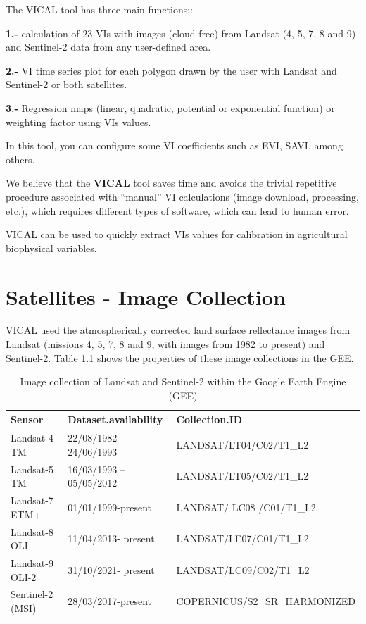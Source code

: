 \documentclass[
]{book}
\begin{document}
The VICAL tool has three main functions::

\textbf{1.-} calculation of 23 VIs with images (cloud-free) from Landsat (4, 5, 7, 8 and 9) and Sentinel-2 data from any user-defined area.

\textbf{2.-} VI time series plot for each polygon drawn by the user with Landsat and Sentinel-2 or both satellites.

\textbf{3.-} Regression maps (linear, quadratic, potential or exponential function) or weighting factor using VIs values.

In this tool, you can configure some VI coefficients such as EVI, SAVI, among others.

We believe that the \textbf{VICAL} tool saves time and avoids the trivial repetitive procedure associated with ``manual'' VI calculations (image download, processing, etc.), which requires different types of software, which can lead to human error.

VICAL can be used to quickly extract VIs values for calibration in agricultural biophysical variables.

\hypertarget{Sat}{%
\chapter{Satellites - Image Collection}\label{Sat}}

VICAL used the atmospherically corrected land surface reflectance images from Landsat (missions 4, 5, 7, 8 and 9, with images from 1982 to present) and Sentinel-2. Table \ref{tab:Sat} shows the properties of these image collections in the GEE.

\begin{table}

\caption{\label{tab:Sat}Image collection of Landsat and Sentinel-2 within the Google Earth Engine (GEE)}
\centering
\begin{tabular}[t]{lll}
\toprule
Sensor & Dataset.availability & Collection.ID\\
\midrule
Landsat-4 TM & 22/08/1982 - 24/06/1993 & LANDSAT/LT04/C02/T1\_L2\\
Landsat-5 TM & 16/03/1993 – 05/05/2012 & LANDSAT/LT05/C02/T1\_L2\\
Landsat-7 ETM+ & 01/01/1999-present & LANDSAT/ LC08 /C01/T1\_L2\\
Landsat-8 OLI & 11/04/2013- present & LANDSAT/LE07/C01/T1\_L2\\
Landsat-9 OLI-2 & 31/10/2021- present & LANDSAT/LC09/C02/T1\_L2\\
\addlinespace
Sentinel-2 (MSI) & 28/03/2017-present & COPERNICUS/S2\_SR\_HARMONIZED\\
\bottomrule
\end{tabular}
\end{table}
\end{document}
